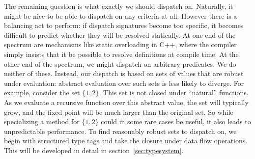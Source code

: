 


The remaining question is what exactly we should dispatch on.
Naturally, it might be nice to be able to dispatch on any criteria
at all.
However there is a balancing act to perform: if dispatch signatures
become too specific, it becomes difficult to predict whether they
will be resolved statically.
At one end of the spectrum are mechanisms like static overloading
in C++, where the compiler simply insists that it be possible to
resolve definitions at compile time.
At the other end of the spectrum, we might dispatch on arbitrary
predicates.
We do neither of these.
Instead, our dispatch is based on sets of values that are robust
under evaluation: abstract evaluation over such sets is less likely
to diverge.
For example, consider the set $\{1,2\}$.
This set is not closed under ``natural'' functions.
As we evaluate a recursive function over this abstract value, the
set will typically grow, and the fixed point will be much larger
than the original set.
So while specializing a method for $\{1,2\}$ could in some rare
cases be useful, it also leads to unpredictable performance.
To find reasonably robust sets to dispatch on, we
begin with structured type tags and take the closure under data flow
operations.
This will be developed in detail in section~\ref{sec:typesystem}.



